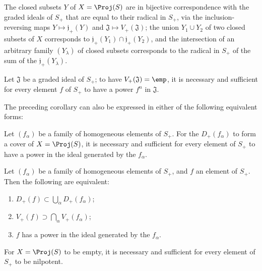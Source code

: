 \begin{corollary}[2.3.12]
\label{II.2.3.12}
The closed subsets $Y$ of $X=\Proj(S)$ are in bijective correspondence with the graded ideals of $S_+$ that are equal to their radical in $S_+$, via the inclusion-reversing maps $Y\mapsto\mathfrak{j}_+(Y)$ and $\mathfrak{J}\mapsto V_+(\mathfrak{J})$;
the union $Y_1\cup Y_2$ of two closed subsets of $X$ corresponds
to $\mathfrak{j}_+(Y_1)\cap\mathfrak{j}_+(Y_2)$, and the intersection of an arbitrary family $(Y_\lambda)$ of closed subsets corresponds to the radical in $S_+$ of the sum of the $\mathfrak{j}_+(Y_\lambda)$.
\end{corollary}

\begin{corollary}[2.3.13]
\label{II.2.3.13}
Let $\mathfrak{J}$ be a graded ideal of $S_+$;
to have $V_+(\mathfrak{J})=\emp$, it is necessary and sufficient for every element $f$ of $S_+$ to have a power $f^n$ in $\mathfrak{J}$.
\end{corollary}

The preceding corollary can also be expressed in either of the following equivalent forms:

\begin{corollary}[2.3.14]
Let $(f_\alpha)$ be a family of homogeneous elements of $S_+$.
For the $D_+(f_\alpha)$ to form a cover of $X=\Proj(S)$, it is necessary and sufficient for every element of $S_+$ to have a power in the ideal generated by the $f_\alpha$.
\label{II.2.3.14}
\end{corollary}

\begin{corollary}[2.3.15]
\label{II.2.3.15}
Let $(f_\alpha)$ be a family of homogeneous elements of $S_+$, and $f$ an element of $S_+$.
Then the following are equivalent:
\begin{enumerate}
  \item[{\rm(a)}] $D_+(f)\subset\bigcup_\alpha D_+(f_\alpha)$;
  \item[{\rm(b)}] $V_+(f)\supset\bigcap_\alpha V_+(f_\alpha)$;
  \item[{\rm(c)}] $f$ has a power in the ideal generated by the $f_\alpha$.
\end{enumerate}
\end{corollary}

\begin{corollary}[2.3.16]
\label{II.2.3.16}
For $X=\Proj(S)$ to be empty, it is necessary and sufficient for every element of $S_+$ to be nilpotent.
\end{corollary}

